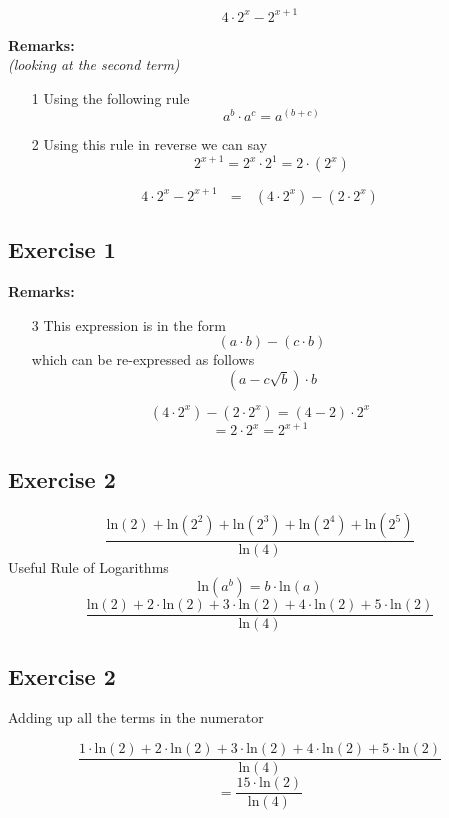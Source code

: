 \documentclass[]{report}
\begin{document}
\[ 4 \cdot 2^x - 2^{x+1} \]

\textbf{Remarks:}\\
\textit{(looking at the second term)}
\begin{itemize}
\item[1] Using the following rule
\[ a^b \cdot a^c = a^{(b+c)}  \] 
\item[2] Using this rule in reverse we can say
\[ 2^{x+1} = 2^x \cdot 2^1  = 2\cdot (2^x) \] 
\end{itemize}
\[ 4 \cdot 2^x - 2^{x+1} \mbox{   } = \mbox{   } (4 \cdot 2^x) -  (2\cdot 2^{x}) \]

\subsection{Exercise 1}


\textbf{Remarks:}
\begin{itemize}
\item[3] This expression is in the form 
\[ (a  \cdot b ) - ( c  \cdot b) \]
which can be re-expressed as follows 
\[ (a - c\sqrt{b} )  \cdot b \]
\end{itemize}
\[ (4 \cdot 2^x) -  (2\cdot 2^{x}) = (4-2)  \cdot 2^{x} \]
\[   = 2 \cdot 2^x = 2^{x+1}\]

\subsection{Exercise 2}


\[  \frac{\mbox{ln}(2) + \mbox{ln}(2^2) + \mbox{ln}(2^3)  + \mbox{ln}(2^4) + \mbox{ln}(2^5)  }  {\mbox{ln}(4)}  \]
Useful Rule of Logarithms
\[  \mbox{ln}(a^b)  = b\cdot \mbox{ln}(a)  \]
\[  \frac{\mbox{ln}(2) + 2 \cdot \mbox{ln}(2) + 3 \cdot\mbox{ln}(2)  + 4 \cdot \mbox{ln}(2) + 5 \cdot \mbox{ln}(2)  }  {\mbox{ln}(4)}  \]
\subsection{Exercise 2}

Adding up all the terms in the numerator

\[  \frac{1\cdot\mbox{ln}(2) + 2 \cdot \mbox{ln}(2) + 3 \cdot\mbox{ln}(2)  + 4 \cdot \mbox{ln}(2) + 5 \cdot \mbox{ln}(2)  }  {\mbox{ln}(4)} \]  \[= \frac{15 \cdot \mbox{ln}(2) }{\mbox{ln}(4)} \]
\end{document}
